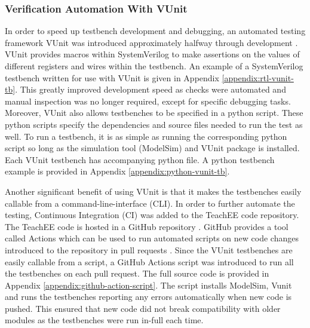 \documentclass[letterpaper,11pt]{article}
\begin{document}
\subsubsection{Verification Automation With VUnit}
In order to speed up testbench development and debugging, an automated testing
framework VUnit was introduced approximately halfway through development
\cite{vunit}. VUnit provides macros within SystemVerilog to make assertions on
the values of different registers and wires within the testbench. An example of
a SystemVerilog testbench written for use with VUnit is given in Appendix
\ref{appendix:rtl-vunit-tb}. This greatly improved development speed as checks
were automated and manual inspection was no longer required, except for specific
debugging tasks. Moreover, VUnit also allows testbenches to be specified in a
python script. These python scripts specify the dependencies and source files
needed to run the test as well. To run a testbench, it is as simple as running
the corresponding python script so long as the simulation tool (ModelSim) and
VUnit package is installed. Each VUnit testbench has accompanying python file. A
python testbench example is provided in Appendix \ref{appendix:python-vunit-tb}.

Another significant benefit of using VUnit is that it makes the testbenches
easily callable from a command-line-interface (CLI). In order to further
automate the testing, Continuous Integration (CI) was added to the TeachEE code
repository. The TeachEE code is hosted in a GitHub repository
\cite{teachee-github}. GitHub provides a tool called Actions which can be used
to run automated scripts on new code changes introduced to the repository in
pull requests \cite{github-actions-doc}. Since the VUnit testbenches are easily
callable from a script, a GitHub Actions script was introduced to run all the
testbenches on each pull request. The full source code is provided in Appendix
\ref{appendix:github-action-script}. The script installs ModelSim, Vunit and
runs the testbenches reporting any errors automatically when new code is pushed.
This ensured that new code did not break compatibility with older modules as the
testbenches were run in-full each time.
\end{document}
